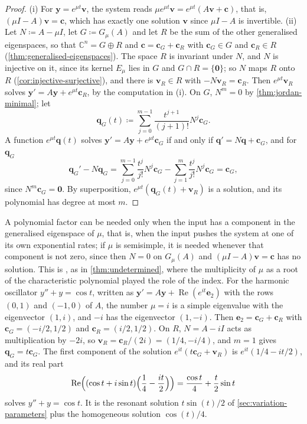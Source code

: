 \begin{proof}
(i) For $\mathbf y=e^{\mu t}\mathbf v$, the system reads $\mu e^{\mu t}\mathbf v=e^{\mu t}(A\mathbf v+\mathbf c)$, that is, $(\mu I-A)\mathbf v=\mathbf c$, which has exactly one solution $\mathbf v$ since $\mu I-A$ is invertible. (ii) Let $N\coloneqq A-\mu I$, let $G\coloneqq G_\mu(A)$ and let $R$ be the sum of the other generalised eigenspaces, so that $\mathbb C^n=G\oplus R$ and $\mathbf c=\mathbf c_G+\mathbf c_R$ with $\mathbf c_G\in G$ and $\mathbf c_R\in R$ (\cref{thm:generalised-eigenspaces}). The space $R$ is invariant under $N$, and $N$ is injective on it, since its kernel $E_\mu$ lies in $G$ and $G\cap R=\{\mathbf 0\}$; so $N$ maps $R$ onto $R$ (\cref{cor:injective-surjective}), and there is $\mathbf v_R\in R$ with $-N\mathbf v_R=\mathbf c_R$. Then $e^{\mu t}\mathbf v_R$ solves $\mathbf y'=A\mathbf y+e^{\mu t}\mathbf c_R$, by the computation in (i). On $G$, $N^m=0$ by \cref{thm:jordan-minimal}; let
\[
\mathbf q_G(t)\coloneqq\sum_{j=0}^{m-1}\frac{t^{j+1}}{(j+1)!}N^j\mathbf c_G .
\]
A function $e^{\mu t}\mathbf q(t)$ solves $\mathbf y'=A\mathbf y+e^{\mu t}\mathbf c_G$ if and only if $\mathbf q'=N\mathbf q+\mathbf c_G$, and for $\mathbf q_G$
\[
\mathbf q_G'-N\mathbf q_G=\sum_{j=0}^{m-1}\frac{t^j}{j!}N^j\mathbf c_G-\sum_{j=1}^{m}\frac{t^j}{j!}N^j\mathbf c_G=\mathbf c_G ,
\]
since $N^m\mathbf c_G=\mathbf 0$. By superposition, $e^{\mu t}(\mathbf q_G(t)+\mathbf v_R)$ is a solution, and its polynomial has degree at most $m$.
\end{proof}

A polynomial factor can be needed only when the input has a component in the generalised eigenspace of $\mu$, that is, when the input pushes the system at one of its own exponential rates; if $\mu$ is semisimple, it is needed whenever that component is not zero, since then $N=0$ on $G_\mu(A)$ and $(\mu I-A)\mathbf v=\mathbf c$ has no solution. This is , as in \cref{thm:undetermined}, where the multiplicity of $\mu$ as a root of the characteristic polynomial played the role of the index. For the harmonic oscillator $y''+y=\cos t$, written as $\mathbf y'=A\mathbf y+\operatorname{Re}(e^{it}\mathbf e_2)$ with the rows $(0,1)$ and $(-1,0)$ of $A$, the number $\mu=i$ is a simple eigenvalue with the eigenvector $(1,i)$, and $-i$ has the eigenvector $(1,-i)$. Then $\mathbf e_2=\mathbf c_G+\mathbf c_R$ with $\mathbf c_G=(-i/2,1/2)$ and $\mathbf c_R=(i/2,1/2)$. On $R$, $N=A-iI$ acts as multiplication by $-2i$, so $\mathbf v_R=\mathbf c_R/(2i)=(1/4,-i/4)$, and $m=1$ gives $\mathbf q_G=t\mathbf c_G$. The first component of the solution $e^{it}(t\mathbf c_G+\mathbf v_R)$ is $e^{it}(1/4-it/2)$, and its real part
\[
\operatorname{Re}\Bigl((\cos t+i\sin t)\Bigl(\frac14-\frac{it}2\Bigr)\Bigr)=\frac{\cos t}4+\frac t2\sin t
\]
solves $y''+y=\cos t$. It is the resonant solution $t\sin(t)/2$ of \cref{sec:variation-parameters} plus the homogeneous solution $\cos(t)/4$.

